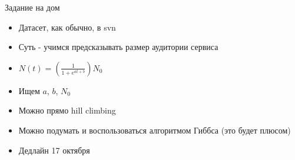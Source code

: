 \documentclass[14pt, fleqn, xcolor={dvipsnames, table}]{beamer}
\begin{document}
\begin{frame}{Задание на дом}
\begin{itemize}
  \item Датасет, как обычно, в svn
  \item Суть - учимся предсказывать размер аудитории сервиса
  \item $N(t) = (\frac{1}{1 + e^{at+b}})N_0$
  \item Ищем $a$, $b$, $N_0$
  \item Можно прямо hill climbing
  \item Можно подумать и воспользоваться алгоритмом Гиббса (это будет плюсом)
  \item Дедлайн 17 октября
\end{itemize}
\end{frame}
\end{document}

